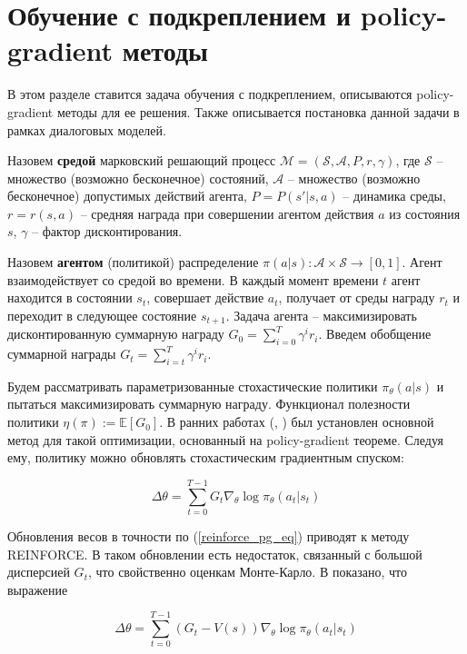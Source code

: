 \documentclass[]{article}
\begin{document}
\section{Обучение с подкреплением и policy-gradient методы}

В этом разделе ставится задача обучения с подкреплением, описываются policy-gradient методы для ее решения. Также описывается постановка данной задачи в рамках диалоговых моделей.

Назовем \textbf{средой} марковский решающий процесс $\mathcal{M} = (\mathcal{S}, \mathcal{A}, P, r, \gamma)$, где $\mathcal{S}$ -- множество (возможно бесконечное) состояний, $\mathcal{A}$ -- множество (возможно бесконечное) допустимых действий агента, $P = P(s' | s,a)$ -- динамика среды, $r = r(s, a)$ -- средняя награда при совершении агентом действия $a$ из состояния $s$, $\gamma$ -- фактор дисконтирования.

Назовем \textbf{агентом} (политикой) распределение $\pi(a|s) : \mathcal{A} \times \mathcal{S} \rightarrow [0, 1]$. Агент взаимодействует со средой во времени. В каждый момент времени $t$ агент находится в состоянии $s_t$, совершает действие $a_t$, получает от среды награду $r_t$ и переходит в следующее состояние $s_{t+1}$. Задача агента -- максимизировать дисконтированную суммарную награду $G_0 = \sum_{i=0}^{T}\gamma^i r_i$. Введем обобщение суммарной награды $G_t = \sum_{i=t}^{T}\gamma^i r_i$.

Будем рассматривать параметризованные стохастические политики $\pi_{\theta}(a|s)$ и пытаться максимизировать суммарную награду. Функционал полезности политики $\eta(\pi) := \mathbb{E}[G_0]$. В ранних работах (\cite{sutton1998reinforcement}, \cite{sutton1999policy}) был установлен основной метод для такой оптимизации, основанный на policy-gradient теореме. Следуя ему, политику можно обновлять стохастическим градиентным спуском:

\begin{equation}
\label{reinforce_pg_eq}
\Delta \theta = \sum_{t=0}^{T-1}G_t \nabla_\theta\log\pi_{\theta}(a_t|s_t)
\end{equation}

Обновления весов в точности по (\ref{reinforce_pg_eq}) приводят к методу REINFORCE. В таком обновлении есть недостаток, связанный с большой дисперсией $G_t$, что свойственно оценкам Монте-Карло. В \cite{sutton1999policy} показано, что выражение

\begin{equation}
\label{a2c_pg_eq}
\Delta \theta = \sum_{t=0}^{T-1}(G_t - V(s)) \nabla_\theta\log\pi_{\theta}(a_t|s_t)
\end{equation}
\end{document}
